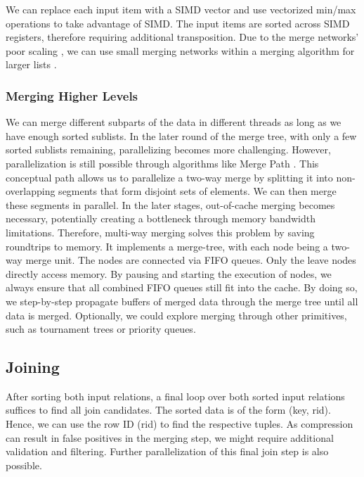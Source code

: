 We can replace each input item with a SIMD vector and use vectorized min/max operations to take
advantage of SIMD. The input items are sorted across SIMD registers, therefore requiring additional
transposition.
Due to the merge networks' poor scaling \cite{DBLP:journals/vldb/MullerTA12}, we can use small merging networks within a merging
algorithm for larger lists \cite{4336211}.


\subsubsection{Merging Higher Levels}

We can merge different subparts of the data in different threads as long as we have enough
sorted sublists. In the later round of the merge tree, with only a few sorted sublists remaining,
parallelizing becomes more challenging. However, parallelization is still possible through
algorithms like Merge Path \cite{MergePath}. This conceptual path allows us to parallelize a two-way
merge by splitting it into non-overlapping segments that form disjoint sets of elements.
We can then merge these segments in parallel. In the later stages, out-of-cache merging becomes
necessary, potentially creating a bottleneck through memory bandwidth limitations. Therefore,
multi-way merging \cite{Balkesen,10.14778/1454159.1454171} solves this problem by saving roundtrips to memory. It implements a 
merge-tree, with each node being a two-way merge unit. The nodes are connected via FIFO queues. 
Only the leave nodes directly access memory. By pausing and starting the execution of nodes,
we always ensure that all combined FIFO queues still fit into the cache. By doing so, we 
step-by-step propagate buffers of merged data through the merge tree until all data is merged.
Optionally, we could explore merging through other primitives, such as
tournament trees or priority queues.

\subsection{Joining}

After sorting both input relations, a final loop over both sorted input relations suffices to find all
join candidates. The sorted data is of the form (key, rid). Hence, we can use the row ID (rid) to
find the respective tuples. As compression can result in false positives in the merging step, we
might require additional validation and 
filtering. Further parallelization of this final join step is also possible.

